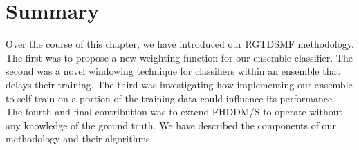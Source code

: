 
\section{Summary}
Over the course of this chapter, we have introduced our RGTDSMF methodology. The first was to propose a new weighting function for our ensemble classifier. The second was a novel windowing technique for classifiers within an ensemble that delays their training. The third was investigating how implementing our ensemble to self-train on a portion of the training data could influence its performance. The fourth and final contribution was to extend FHDDM/S to operate without any knowledge of the ground truth. We have described the components of our methodology and their algorithms.